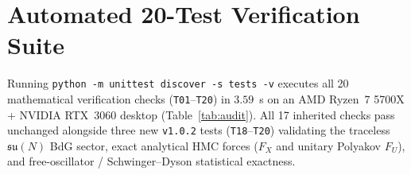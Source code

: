 \documentclass[11pt,a4paper]{article}
\begin{document}
\section{Automated 20-Test Verification Suite}
\label{sec:audit}

Running \texttt{python -m unittest discover -s tests -v} executes all 20 mathematical verification checks (\texttt{T01}--\texttt{T20}) in $3.59$~s on an AMD Ryzen~7 5700X + NVIDIA RTX~3060 desktop (Table~\ref{tab:audit}). All 17 inherited checks pass unchanged alongside three new \texttt{v1.0.2} tests (\texttt{T18}--\texttt{T20}) validating the traceless $\mathfrak{su}(N)$ BdG sector, exact analytical HMC forces ($F_X$ and unitary Polyakov $F_U$), and free-oscillator / Schwinger--Dyson statistical exactness.
\end{document}
